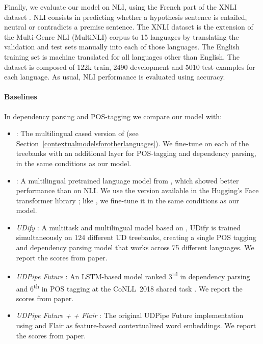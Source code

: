 Finally, we evaluate our model on NLI, using the French part of the XNLI dataset \cite{conneau2018xnli}. NLI consists in predicting whether a hypothesis sentence is entailed, neutral or contradicts a premise sentence. The XNLI dataset is the extension of the Multi-Genre NLI (MultiNLI) corpus \cite{williams2018broad} to 15 languages by translating the validation and test sets manually into each of those languages.
The English training set is machine translated for all languages other than English.
The dataset is composed of 122k train, 2490 development and 5010 test examples for each language.
As usual, NLI performance is evaluated using accuracy.


\paragraph{Baselines}
In dependency parsing and POS-tagging we compare our model with:

\begin{itemize}
    \item \emph{\mbert}: The multilingual cased version of \bert (see Section~\ref{contextualmodelsforotherlanguages}). We fine-tune \mbert on each of the treebanks with an additional layer for POS-tagging and dependency parsing, in the same conditions as our \camembert model.
    \item \emph{\xlmmlmtlm}: A multilingual pretrained language model from \citet{conneau-lample-2019-cross}, which showed better performance than \mbert on NLI. We use the version available in the Hugging's Face transformer library \cite{Wolf2019HuggingFacesTS}; like \mbert, we fine-tune it in the same conditions as our model.
    \item \emph{UDify} \cite{kondratyuk201975}: A multitask and multilingual model based on \mbert, UDify is trained simultaneously on 124 different UD treebanks, creating a single POS tagging and dependency parsing model that works across 75 different languages. We report the scores from \citet{kondratyuk201975} paper.
    \item \emph{UDPipe Future} \citep{straka2018udpipe}: An LSTM-based model ranked 3\textsuperscript{rd} in dependency parsing and 6\textsuperscript{th} in POS tagging at the CoNLL~2018 shared task \citep{seker2018universal}. We report the scores from \citet{kondratyuk201975} paper.
    \item \emph{UDPipe Future + \mbert + Flair} \citep{straka2019evaluating}: The original UDPipe Future implementation using \mbert and Flair as feature-based contextualized word embeddings. We report the scores from \citet{straka2019evaluating} paper.
\end{itemize}

